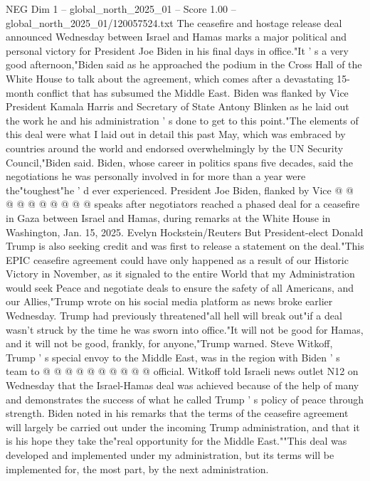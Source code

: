\begin{textsample}{NEG Dim 1 – global\_north\_2025\_01 – Score 1.00 – global\_north\_2025\_01/120057524.txt}  \label{ex:f1_neg_085}
The ceasefire and hostage release deal announced Wednesday between Israel and Hamas marks a major political and personal victory for President Joe Biden in his final days in office."It ' s a very good afternoon,"Biden said as he approached the podium in the Cross Hall of the White House to talk about the agreement, which comes after a devastating 15-month conflict that has subsumed the Middle East.
Biden was flanked by Vice President Kamala Harris and Secretary of State Antony Blinken as he laid out the work he and his administration ' s done to get to this point."The elements of this deal were what I laid out in detail this past May, which was embraced by countries around the world and endorsed overwhelmingly by the UN Security Council,"Biden said.
Biden, whose career in politics spans five decades, said the negotiations he was personally involved in for more than a year were the"toughest"he ' d ever experienced.
President Joe Biden, flanked by Vice @ @ @ @ @ @ @ @ @ @ speaks after negotiators reached a phased deal for a ceasefire in Gaza between Israel and Hamas, during remarks at the White House in Washington, Jan. 15, 2025.
Evelyn Hockstein/Reuters But President-elect Donald Trump is also seeking credit and was first to release a statement on the deal."This EPIC ceasefire agreement could have only happened as a result of our Historic Victory in November, as it signaled to the entire World that my Administration would seek Peace and negotiate deals to ensure the safety of all Americans, and our Allies,"Trump wrote on his social media platform as news broke earlier Wednesday.
Trump had previously threatened"all hell will break out"if a deal wasn't struck by the time he was sworn into office."It will not be good for Hamas, and it will not be good, frankly, for anyone,"Trump warned.
Steve Witkoff, Trump ' s special envoy to the Middle East, was in the region with Biden ' s team to @ @ @ @ @ @ @ @ @ @ official.
Witkoff told Israeli news outlet N12 on Wednesday that the Israel-Hamas deal was achieved because of the help of many and demonstrates the success of what he called Trump ' s policy of peace through strength.
Biden noted in his remarks that the terms of the ceasefire agreement will largely be carried out under the incoming Trump administration, and that it is his hope they take the"real opportunity for the Middle East.""This deal was developed and implemented under my administration, but its terms will be implemented for, the most part, by the next administration.

\end{textsample}
